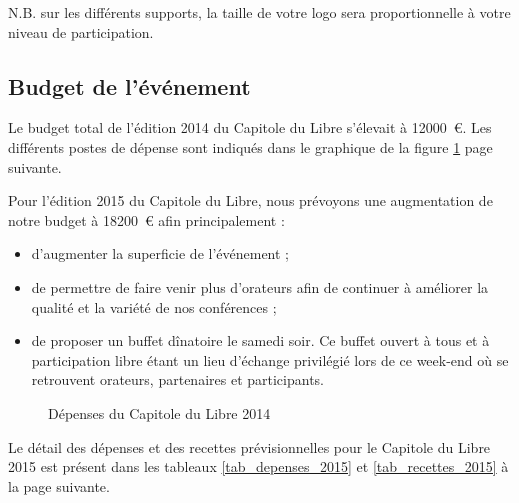 N.B. sur les différents supports, la taille de votre logo sera proportionnelle à votre niveau de participation.

	\subsection{Budget de l’événement}

Le budget total de l'édition 2014 du Capitole du Libre s'élevait à
 \SI{12000}{\euro}. Les différents postes de dépense sont indiqués dans
 le graphique de la figure \ref{fig_budget} page suivante.

Pour l'édition 2015 du Capitole du Libre, nous prévoyons une augmentation de notre budget à \SI{18200}{€} afin principalement :
\begin{itemize}[label=$\bullet$]
\item d'augmenter la superficie de l'événement ;
\item de permettre de faire venir plus d'orateurs afin de continuer à améliorer la qualité et la variété de nos conférences ;
\item de proposer un buffet dînatoire le samedi soir. Ce buffet ouvert à tous et à participation libre étant un lieu d'échange privilégié lors de ce week-end où se retrouvent orateurs, partenaires et participants.
\end{itemize}

\begin{figure}
\begin{center}
\end{center}
\caption{Dépenses du Capitole du Libre 2014}\label{fig_budget}
\end{figure}

\Separateur

Le détail des dépenses et des recettes prévisionnelles pour le Capitole du Libre 2015 est présent dans les tableaux \ref{tab_depenses_2015} et \ref{tab_recettes_2015} à la page suivante.

